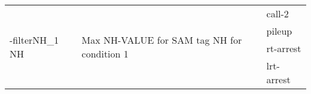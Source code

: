 {\small
\begin{tabular}{@{}p{}p{}l@{}}
\multirow{4}{=}{-filterNH\_1 NH} & \multirow{4}{=}{Max NH-VALUE for SAM tag NH for condition 1} & call-2 \\
 &  & pileup \\
 &  & rt-arrest \\
 &  & lrt-arrest \\
\end{tabular}\\
}
